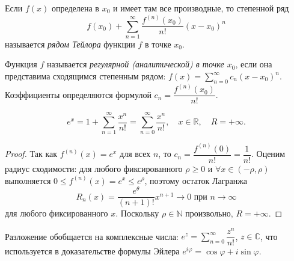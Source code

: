 
\begin{defn}
  Если $f(x)$ определена в $x_0$ и имеет там все производные, то степенной ряд
  \[
    f(x_0) + \sum_{n=1}^{\infty} \frac{f^{(n)}(x_0)}{n!}(x-x_0)^n
  \]
  называется \emph{рядом Тейлора} функции $f$ в точке $x_0$.
\end{defn}

\begin{defn}
  Функция $f$ называется \emph{регулярной (аналитической) в точке $x_0$},
  если она представима сходящимся степенным рядом:
  $f(x) = \sum_{n=0}^{\infty} c_n(x-x_0)^n$.
  Коэффициенты определяются формулой $c_n = \dfrac{f^{(n)}(x_0)}{n!}$.
\end{defn}

\begin{theorem}
  \[
    e^x = 1 + \sum_{n=1}^{\infty} \frac{x^n}{n!} = \sum_{n=0}^{\infty} \frac{x^n}{n!},
    \quad x \in \mathbb{R},\quad R = +\infty.
  \]
  \begin{proof}
    Так как $f^{(n)}(x) = e^x$ для всех $n$, то $c_n = \dfrac{f^{(n)}(0)}{n!} = \dfrac{1}{n!}$.
    Оценим радиус сходимости: для любого фиксированного $\rho \geq 0$ и $\forall x \in (-\rho, \rho)$
    выполняется $0 \leq f^{(n)}(x) = e^x \leq e^\rho$, поэтому остаток Лагранжа
    \[
      R_n(x) = \frac{e^\theta}{(n+1)!}x^{n+1} \to 0 \text{ при } n \to \infty
    \]
    для любого фиксированного $x$. Поскольку $\rho \in \mathbb{N}$ произвольно, $R = +\infty$.
  \end{proof}
\end{theorem}

\begin{note}
  Разложение обобщается на комплексные числа: $e^z = \sum_{n=0}^{\infty} \dfrac{z^n}{n!}$,
  $z \in \mathbb{C}$, что используется в доказательстве формулы Эйлера $e^{i\varphi} = \cos\varphi + i\sin\varphi$.
\end{note}
